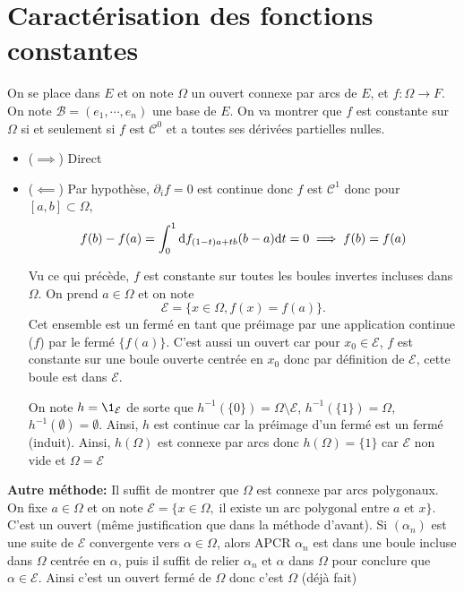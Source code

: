 \section{Caractérisation des fonctions constantes}

On se place dans $E$ et on note $\Omega$ un ouvert connexe par arcs de $E$, et $f:\Omega \to F$. On note $\mathcal B=(e_1, \cdots, e_n)$ une base de $E$. On va montrer que $f$ est constante sur $\Omega$ si et seulement si $f$ est $\mathcal C^0$ et a toutes ses dérivées partielles nulles.

\begin{itemize}
    \item ($\implies$) Direct
    \item ($\impliedby$) Par hypothèse, $\partial_if =0$ est continue donc $f$ est $\mathcal C^1$ donc pour $[a, b]\subset \Omega$, \[
            f(b)-f(a)=\int_0^1\mathrm{d} f_{(1-t)a+tb}(b-a)\mathrm{d} t=0\implies f(b)=f(a)
        \]

        Vu ce qui précède, $f$ est constante sur toutes les boules invertes incluses dans $\Omega$. On prend $a\in\Omega$ et on note \[
            \mathcal E=\{x\in\Omega, f(x)=f(a)\}.
        \]
        Cet ensemble est un fermé en tant que préimage par une application continue ($f$) par le fermé $\{f(a)\}$. C'est aussi un ouvert car pour $x_0\in\mathcal E$, $f$ est constante sur une boule ouverte centrée en $x_0$ donc par définition de $\mathcal E$, cette boule est dans $\mathcal E$.

        On note $h=\1_{\mathcal E}$ de sorte que $h^{-1}(\{0\})=\Omega\setminus \mathcal E$, $h^{-1}(\{1\})=\Omega$, $h^{-1}(\emptyset)=\emptyset$. Ainsi, $h$ est continue car la préimage d'un fermé est un fermé (induit). Ainsi, $h(\Omega)$ est connexe par arcs donc $h(\Omega)=\{1\}$ car $\mathcal E$ non vide et $\Omega=\mathcal E$
\end{itemize}


\textbf{Autre méthode:} Il suffit de montrer que $\Omega$ est connexe par arcs polygonaux. On fixe $a\in\Omega$ et on note $\mathcal E=\{x\in\Omega, \; \text{il existe un arc polygonal entre }a \text{ et } x\}$. C'est un ouvert (même justification que dans la méthode d'avant). Si $(\alpha_n)$ est une suite de $\mathcal E$ convergente vers $\alpha\in\Omega$, alors APCR $\alpha_n$ est dans une boule incluse dans $\Omega$ centrée en $\alpha$, puis il suffit de relier $\alpha_n$ et $\alpha$ dans $\Omega$ pour conclure que $\alpha\in\mathcal E$. Ainsi c'est un ouvert fermé de $\Omega$ donc c'est $\Omega$ (déjà fait)

